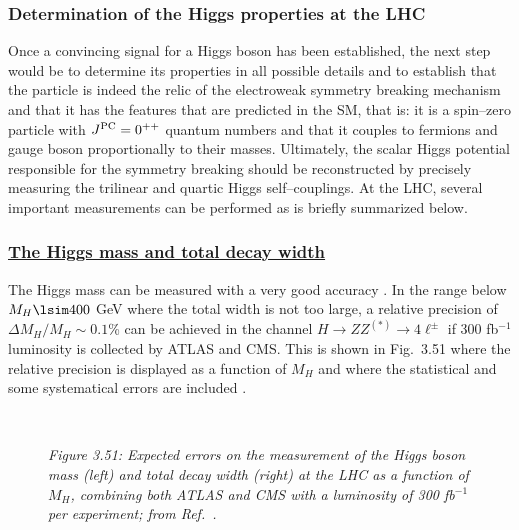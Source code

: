 \subsubsection{Determination of the Higgs properties at the LHC}

Once a convincing signal for a Higgs boson has been established, the next step
would be to determine its properties in all possible details and to establish 
that the particle is indeed the relic of the electroweak symmetry breaking 
mechanism and that it has the features that are predicted in the SM, that is:
it is a spin--zero particle with $J^{\rm PC}= 0^{++}$ quantum numbers and that
it couples to fermions and gauge boson proportionally to their masses. 
Ultimately, the scalar Higgs potential responsible for the symmetry breaking
should be reconstructed by precisely measuring the trilinear and quartic Higgs 
self--couplings. At the LHC, several important measurements can be performed 
as is briefly summarized below. 

\subsubsection*{\underline{The Higgs mass and total decay width}}

The Higgs mass can be measured with a very good accuracy 
\cite{pp-meas-mass+width}.
In the range below $M_H \lsim 400$ GeV where the total width is not too large,
a relative precision of $\Delta M_H/M_H \sim 0.1$\% can be achieved in the
channel $H \to ZZ^{(*)} \to 4\ell^\pm$ if 300 fb$^{-1}$ luminosity is
collected by ATLAS and CMS. This is shown in Fig.~3.51 where
the relative precision is displayed as a function of $M_H$ and where the
statistical and some systematical errors are included \cite{Mass-Fabiola}.\s 

\begin{figure}[!h]
\vspace{-.9cm}
\begin{center}
\mbox{ \hspace*{-2mm}
}
\end{center}
\vspace{-.4cm}
{\it Figure 3.51: Expected errors on the measurement of the Higgs boson mass 
(left) and total decay width (right) at the LHC as a function of $M_H$, 
combining both ATLAS and CMS with a luminosity of 300 fb$^{-1}$ per experiment;
from Ref.~\cite{Mass-Fabiola}.}
\label{fig:Hmass}
\vspace{-.5cm}
\end{figure}

